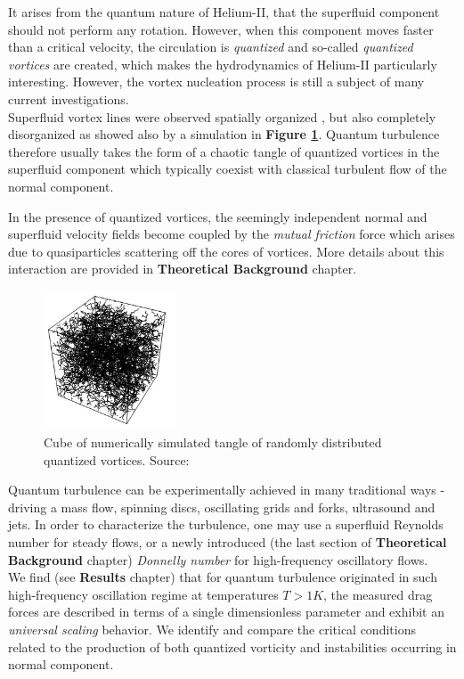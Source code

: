 	It arises from the quantum nature of Helium-II, that the superfluid component should not perform any rotation. However, when this component moves faster than a critical velocity, the circulation is \textit{quantized} and so-called \textit{quantized vortices} are created, which makes the hydrodynamics of Helium-II particularly interesting. However, the vortex nucleation process is still a subject of many current investigations.\\
	Superfluid vortex lines were observed spatially organized \cite{bewley}, but also completely disorganized as showed also by a simulation in \textbf{Figure \ref{sim_cube}}. Quantum turbulence therefore usually takes the form of a chaotic tangle of quantized vortices in the superfluid component which typically coexist with classical turbulent flow of the normal component.

	In the presence of quantized vortices, the seemingly independent normal and superfluid velocity fields become coupled by the \textit{mutual friction} force which arises due to quasiparticles scattering off the cores of vortices. More details about this interaction are provided in \textbf{Theoretical Background} chapter.

	\begin{figure}[h]
		\centering
		\includegraphics[width=0.35\textwidth]{graphics/theory/QT-tangle}
		\caption{Cube of numerically simulated tangle of randomly distributed quantized vortices. Source:\cite{svoc2016}}
		\label{sim_cube}
	\end{figure}

	Quantum turbulence can be experimentally achieved in many traditional ways - driving a mass flow, spinning discs, oscillating grids and forks, ultrasound and jets. In order to characterize the turbulence, one may use a superfluid Reynolds number for steady flows, or a newly introduced (the last section of \textbf{Theoretical Background} chapter) \textit{Donnelly number} for high-frequency oscillatory flows.\\
	We find (see \textbf{Results} chapter) that for quantum turbulence originated in such high-frequency oscillation regime at temperatures $T > 1\unit{K}$, the measured drag forces are described in terms of a single dimensionless parameter and exhibit an \textit{universal scaling} behavior. We identify and compare the critical conditions related to the production of both quantized vorticity and instabilities occurring in normal component.

